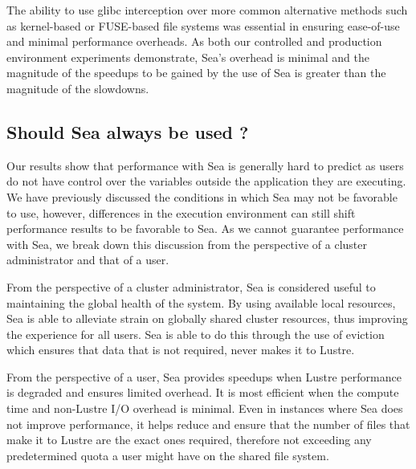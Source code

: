     The ability to use glibc interception over more common alternative methods
    such as kernel-based or FUSE-based file systems was essential in ensuring
    ease-of-use and minimal performance overheads. As both our controlled and
    production environment experiments demonstrate, Sea's overhead is minimal
    and the magnitude of the speedups to be gained by the use of Sea is
    greater than the magnitude of the slowdowns.
    
    \subsection{Should Sea always be used ?}
    
    Our results show that performance with Sea is generally hard to predict as
    users do not have control over the variables outside the application they
    are executing. We have previously discussed the conditions in which Sea may
    not be favorable to use, however, differences in the execution environment
    can still shift performance results to be favorable to Sea. As we cannot
    guarantee performance with Sea, we break down this discussion from the
    perspective of a cluster administrator and that of a user.

    From the perspective of a cluster administrator, Sea is considered useful to
    maintaining the global health of the system. By using available local
    resources, Sea is able to alleviate strain on globally shared cluster
    resources, thus improving the experience for all users. Sea is able to do
    this through the use of eviction which ensures that data that is not
    required, never makes it to Lustre.


    From the perspective of a user, Sea provides speedups when
    Lustre performance is degraded and ensures limited overhead. It is most efficient
    when the compute time and non-Lustre I/O overhead is minimal. Even in
    instances where Sea does not improve performance, it helps reduce and ensure
    that the number of files that make it to Lustre are the exact ones required,
    therefore not exceeding any predetermined quota a user might have on the
    shared file system. 
    
    
    
    
    
    
    
